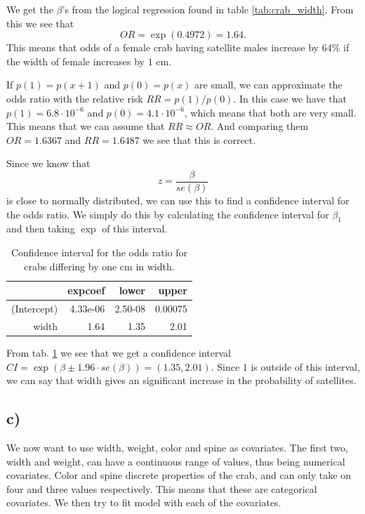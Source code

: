 \documentclass[a4paper,norsk, 10pt]{article}
\begin{document}
We get the $\beta$'s from the logical regression found in table \ref{tab:crab_width}. From this we see that 
\begin{equation}
OR = \exp(0.4972) = 1.64.
\end{equation}
This means that odds of a female crab having satellite males increase by $64\%$ if the width of female increases by $1$ cm.

If $p(1) = p(x+1)$ and $p(0)=p(x)$ are small, we can approximate the odds ratio with the relative risk $RR = p(1)/p(0)$. In this case we have that $p(1) = 6.8\cdot 10^{-6}$ and $p(0) = 4.1 \cdot 10^{-6}$, which means that both are very small. This means that we can assume that $RR \approx OR$. And comparing them $OR = 1.6367$ and $RR = 1.6487$ we see that this is correct.

Since we know that 
\begin{equation}
z = \frac{\beta}{se(\beta)}
\end{equation}
is close to normally distributed, we can use this to find a confidence interval for the odds ratio. We simply do this by calculating the confidence interval for $\beta_1$ and then taking $\exp$ of this interval. 

\begin{table}[!ht]
\centering
\begin{tabular}{rrrr}
  \hline
 & expcoef & lower & upper \\ 
  \hline
(Intercept) & 4.33e-06 & 2.50-08 & 0.00075 \\ 
  width & 1.64 & 1.35 & 2.01 \\ 
   \hline
\end{tabular}
\caption{Confidence interval for the odds ratio for crabs differing by one cm in width.}\label{tab:crabs_OR_CI}
\end{table}

From tab. \ref{tab:crabs_OR_CI} we see that we get a confidence interval $CI = \exp(\beta \pm 1.96\cdot se(\beta)) = (1.35,2.01)$. Since $1$ is outside of this interval, we can say that width gives an significant increase in the probability of satellites. 

\subsection{c)}
We now want to use width, weight, color and spine as covariates. The first two, width and weight, can have a continuous range of values, thus being numerical covariates. Color and spine discrete properties of the crab, and can only take on four and three values respectively. This means that these are categorical covariates. We then try to fit model with each of the covariates.
\end{document}
